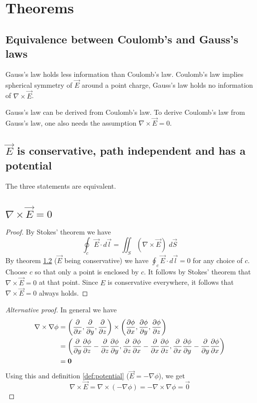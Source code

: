 \section{Theorems}


\subsection{Equivalence between Coulomb's and Gauss's laws}
\label{thm:coulomb-gauss}
Gauss's law holds less information than Coulomb's law. Coulomb's law
implies spherical symmetry of $\vec{E}$ around a point charge, Gauss's
law holds no information of $\nabla\times\vec{E}$.

Gauss's law can be derived from Coulomb's law. To derive Coulomb's law
from Gauss's law, one also needs the assumption $\nabla\times\vec{E}=0$.


\subsection{$\vec{E}$ is conservative, path independent and has a potential}
\label{thm:conservative}
The three statements are equivalent.


\subsection{$\nabla\times\vec{E} = 0$}
\begin{proof}
  By Stokes' theorem we have
  \begin{equation*}
    \oint_c \vec{E}\cdot d\vec{l} = \iint_S (\nabla\times\vec{E})\;d\vec{S}
  \end{equation*}
  By theorem \ref{thm:conservative} ($\vec{E}$ being conservative) we
  have $\oint_c \vec{E}\cdot d\vec{l} = 0$ for any choice of $c$. Choose
  $c$ so that only a point is enclosed by $c$. It follows by Stokes'
  theorem that $\nabla\times\vec{E}=0$ at that point. Since $E$ is
  conservative everywhere, it follows that $\nabla\times\vec{E}=0$
  always holds.
\end{proof}

\begin{proof}[Alternative proof]
  In general we have
  \begin{align*}
    \nabla\times\nabla\phi &= \left(\frac{\partial}{\partial x},\frac{\partial}{\partial y},\frac{\partial}{\partial z}\right)\times\left(\frac{\partial \phi}{\partial x},
    \frac{\partial \phi}{\partial y}, \frac{\partial \phi}{\partial z}\right) \\
    &= \left(
         \frac{\partial}{\partial y}\frac{\partial \phi}{\partial z}-\frac{\partial}{\partial z}\frac{\partial \phi}{\partial y},
         \frac{\partial}{\partial z}\frac{\partial \phi}{\partial x}-\frac{\partial}{\partial x}\frac{\partial \phi}{\partial z},
         \frac{\partial}{\partial x}\frac{\partial \phi}{\partial y}-\frac{\partial}{\partial y}\frac{\partial \phi}{\partial x}
       \right) \\
    &= \boldsymbol{0}
  \end{align*}
  Using this and definition \ref{def:potential} ($\vec{E} = - \nabla\phi$),
  we get
  \begin{equation*}
    \nabla\times\vec{E} = \nabla\times(-\nabla\phi) =
    -\nabla\times\nabla\phi = \vec{0}
  \end{equation*}
\end{proof}


